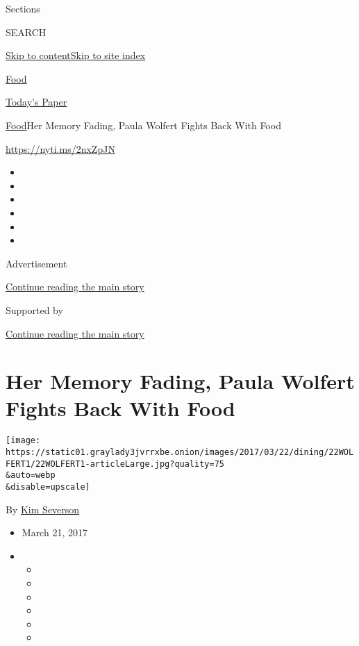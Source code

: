 Sections

SEARCH

\protect\hyperlink{site-content}{Skip to
content}\protect\hyperlink{site-index}{Skip to site index}

\href{https://www.nytimes3xbfgragh.onion/section/food}{Food}

\href{https://myaccount.nytimes3xbfgragh.onion/auth/login?response_type=cookie\&client_id=vi}{}

\href{https://www.nytimes3xbfgragh.onion/section/todayspaper}{Today's
Paper}

\href{/section/food}{Food}\textbar{}Her Memory Fading, Paula Wolfert
Fights Back With Food

\url{https://nyti.ms/2nxZpJN}

\begin{itemize}
\item
\item
\item
\item
\item
\item
\end{itemize}

Advertisement

\protect\hyperlink{after-top}{Continue reading the main story}

Supported by

\protect\hyperlink{after-sponsor}{Continue reading the main story}

\hypertarget{her-memory-fading-paula-wolfert-fights-back-with-food}{%
\section{Her Memory Fading, Paula Wolfert Fights Back With
Food}\label{her-memory-fading-paula-wolfert-fights-back-with-food}}

\texttt{[image: https://static01.graylady3jvrrxbe.onion/images/2017/03/22/dining/22WOLFERT1/22WOLFERT1-articleLarge.jpg?quality=75\\\&auto=webp\\\&disable=upscale]}

By \href{http://www.nytimes3xbfgragh.onion/by/kim-severson}{Kim
Severson}

\begin{itemize}
\item
  March 21, 2017
\item
  \begin{itemize}
  \item
  \item
  \item
  \item
  \item
  \item
  \end{itemize}
\end{itemize}

